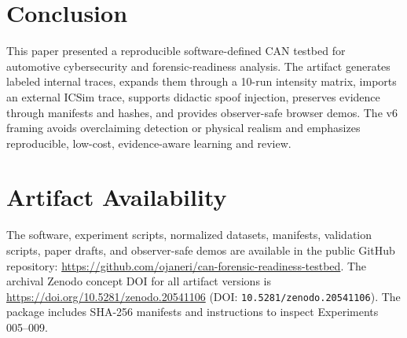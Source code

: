 \documentclass[conference]{IEEEtran}
\begin{document}
\section{Conclusion}
This paper presented a reproducible software-defined CAN testbed for automotive cybersecurity and forensic-readiness analysis. The artifact generates labeled internal traces, expands them through a 10-run intensity matrix, imports an external ICSim trace, supports didactic spoof injection, preserves evidence through manifests and hashes, and provides observer-safe browser demos. The v6 framing avoids overclaiming detection or physical realism and emphasizes reproducible, low-cost, evidence-aware learning and review.

\section*{Artifact Availability}
The software, experiment scripts, normalized datasets, manifests, validation scripts, paper drafts, and observer-safe demos are available in the public GitHub repository: \url{https://github.com/ojaneri/can-forensic-readiness-testbed}. The archival Zenodo concept DOI for all artifact versions is \url{https://doi.org/10.5281/zenodo.20541106} (DOI: \texttt{10.5281/zenodo.20541106}). The package includes SHA-256 manifests and instructions to inspect Experiments 005--009.



\end{document}
